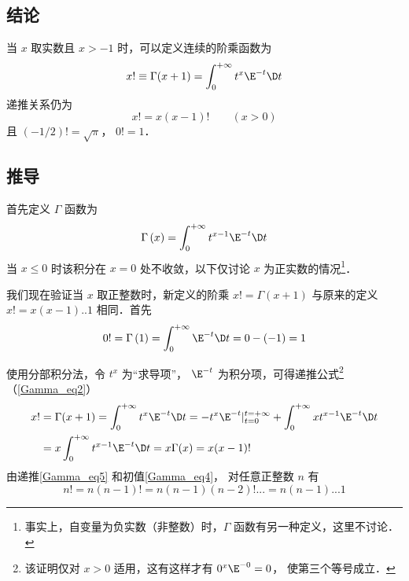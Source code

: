 

\subsection{结论}
当 $x$ 取实数且 $x>-1$ 时，可以定义连续的阶乘函数为
\begin{equation}
x! \equiv \Gamma (x + 1) = \int_0^{ + \infty } {{t^x}{\E^{ - t}}\D t} 
\end{equation}
递推关系仍为
\begin{equation}\label{Gamma_eq2}
x!=x(x-1)! \qquad (x>0)
\end{equation}
且 $(-1/2)!=\sqrt{\pi}$，  $0! = 1$．

\subsection{推导}

首先定义 $\Gamma$  函数为
\begin{equation}
\Gamma \left( x \right) = \int_0^{ + \infty } {{t^{x - 1}}{\E^{ - t}}\D t} 
\end{equation}
当 $x \le 0$ 时该积分在 $x=0$ 处不收敛，以下仅讨论 $x$ 为正实数的情况\footnote{事实上，自变量为负实数（非整数）时，$\Gamma$ 函数有另一种定义，这里不讨论．}．

我们现在验证当 $x$ 取正整数时，新定义的阶乘 $x! = \Gamma(x+1)$ 与原来的定义 $x! = x(x-1)..1$ 相同．首先
\begin{equation}\label{Gamma_eq4}
0! = \Gamma \left( 1 \right) = \int_0^{ + \infty } {\E^{ - t}\D t} = 0-(-1) = 1
\end{equation}

使用分部积分法，令 ${t^x}$ 为“求导项”， ${\E^{ - t}}$ 为积分项，可得递推公式\footnote{该证明仅对 $x>0$ 适用，这有这样才有 $0^x \E^{-0}=0$， 使第三个等号成立．}（\autoref{Gamma_eq2}）
\begin{equation}\label{Gamma_eq5}
\begin{aligned}
x! &= \Gamma ( x+1) = \int_0^{ + \infty } {{t^x}{\E^{ - t}}\D t} =  - {t^x}{\E^{ - t}}|_{t = 0}^{t =  + \infty } + \int_0^{ + \infty } {x{t^{x - 1}}{\E^{ - t}}\D t} \\
&= x\int_0^{ + \infty } {{t^{x - 1}}{\E^{ - t}}\D t} = x\Gamma (x) = x(x-1)!
\end{aligned} \end{equation} 
由递推\autoref{Gamma_eq5} 和初值\autoref{Gamma_eq4}， 对任意正整数 $n$ 有
\begin{equation}
n! = n(n-1)! = n(n-1)(n-2)!... = n(n-1)...1
\end{equation}

